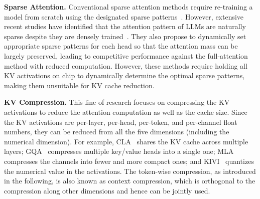 \textbf{Sparse Attention.} Conventional sparse attention methods require re-training a model from scratch using the designated sparse patterns~\citep{zaheer2020bigbird,beltagy2020longformer}. However, extensive recent studies have identified that the attention pattern of LLMs are naturally sparse despite they are densely trained~\citep{jiang2024minference,xiao2023streamingllm,han2023lm_infinite,zhu2024sample_attention}. They also propose to dynamically set appropriate sparse patterns for each head so that the attention mass can be largely preserved, leading to competitive performance against the full-attention method with reduced computation. However, these methods require holding all KV activations on chip to dynamically determine the optimal sparse patterns, making them unsuitable for KV cache reduction.

\textbf{KV Compression.} This line of research focuses on compressing the KV activations to reduce the attention computation as well as the cache size. Since the KV activations are per-layer, per-head, per-token, and per-channel float numbers, they can be reduced from all the five dimensions (including the numerical dimension). For example, CLA~\citep{brandon2024cla} shares the KV cache across multiple layers; GQA~\citep{ainslie2023gqa} compresses multiple key/value heads into a single one; MLA~\citep{deepseekai2024deepseekv2} compresses the channels into fewer and more compact ones; and KIVI~\citep{liu2023kivi} quantizes the numerical value in the activations. The token-wise compression, as introduced in the following, is also known as context compression, which is orthogonal to the compression along other dimensions and hence can be jointly used.

